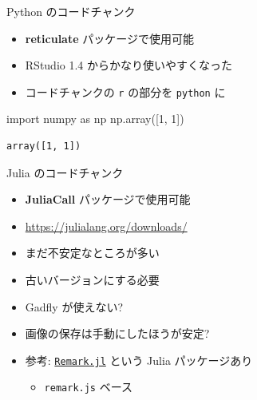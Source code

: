 \documentclass[
  ignorenonframetext,
]{beamer}
\newenvironment{Shaded}{\begin{snugshade}}{\end{snugshade}}
\newcommand{\DecValTok}[1]{\textcolor[rgb]{0.00,0.00,0.81}{#1}}
\newcommand{\ImportTok}[1]{#1}
\newcommand{\NormalTok}[1]{#1}
\providecommand{\tightlist}{%
  \setlength{\itemsep}{0pt}\setlength{\parskip}{0pt}}
\begin{document}
\begin{frame}[fragile]{Python のコードチャンク}
\protect\hypertarget{python-ux306eux30b3ux30fcux30c9ux30c1ux30e3ux30f3ux30af}{}
\begin{itemize}
\tightlist
\item
  \textbf{reticulate} パッケージで使用可能
\item
  RStudio 1.4 からかなり使いやすくなった
\item
  コードチャンクの \texttt{r} の部分を \texttt{python} に
\end{itemize}

\begin{Shaded}
\begin{Highlighting}[]
\ImportTok{import}\NormalTok{ numpy }\ImportTok{as}\NormalTok{ np}
\NormalTok{np.array([}\DecValTok{1}\NormalTok{, }\DecValTok{1}\NormalTok{])}
\end{Highlighting}
\end{Shaded}

\begin{verbatim}
array([1, 1])
\end{verbatim}
\end{frame}

\begin{frame}[fragile]{Julia のコードチャンク}
\protect\hypertarget{julia-ux306eux30b3ux30fcux30c9ux30c1ux30e3ux30f3ux30af}{}
\begin{itemize}
\tightlist
\item
  \textbf{JuliaCall} パッケージで使用可能
\item
  \url{https://julialang.org/downloads/}
\item
  まだ不安定なところが多い
\item
  古いバージョンにする必要
\item
  Gadfly が使えない?
\item
  画像の保存は手動にしたほうが安定?
\item
  参考: \href{https://github.com/piever/Remark.jl}{\texttt{Remark.jl}} という Julia パッケージあり

  \begin{itemize}
  \tightlist
  \item
    \texttt{remark.js} ベース
  \end{itemize}
\end{itemize}
\end{frame}
\end{document}
